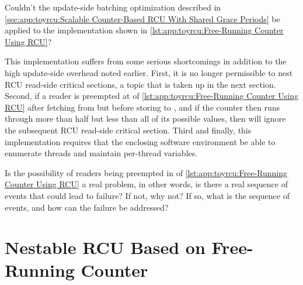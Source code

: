 \QuickQuiz{}
	Couldn't the update-side batching optimization described in
	\cref{sec:app:toyrcu:Scalable Counter-Based RCU With Shared Grace Periods}
	be applied to the implementation shown in
	\cref{lst:app:toyrcu:Free-Running Counter Using RCU}?
 \QuickQuizEnd

\begin{lineref}
This implementation suffers from some serious shortcomings in
addition to the high update-side overhead noted earlier.
First, it is no longer permissible to nest RCU read-side critical
sections, a topic that is taken up in the next section.
Second, if a reader is preempted at  of
\cref{lst:app:toyrcu:Free-Running Counter Using RCU} after fetching from
 but before storing to ,
and if the  counter then runs through more than half
but less than all of its possible values, then 
will ignore the subsequent RCU read-side critical section.
Third and finally, this implementation requires that the enclosing software
environment be able to enumerate threads and maintain per-thread
variables.
\end{lineref}

\QuickQuiz{}
	\begin{lineref}
	Is the possibility of readers being preempted in
	 of
	\cref{lst:app:toyrcu:Free-Running Counter Using RCU}
	a real problem, in other words, is there a real sequence
	of events that could lead to failure?
	If not, why not?
	If so, what is the sequence of events, and how can the
	failure be addressed?
	\end{lineref}
 \QuickQuizEnd

\section{Nestable RCU Based on Free-Running Counter}
\label{sec:app:toyrcu:Nestable RCU Based on Free-Running Counter}

